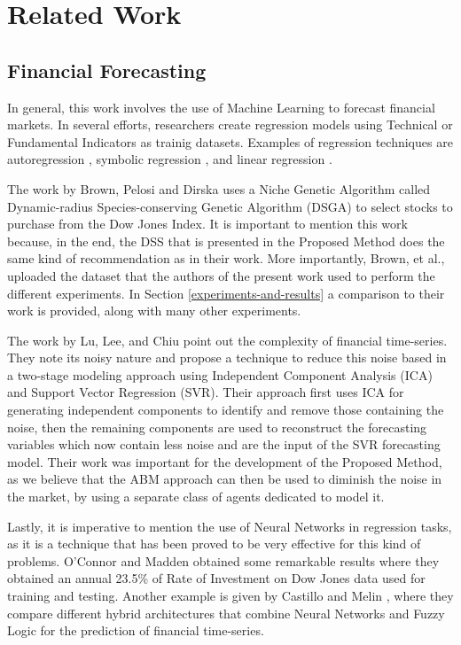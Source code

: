 \documentclass[review]{elsarticle}
\begin{document}
\section{Related Work}
\label{section:related-work}

\subsection{Financial Forecasting}
\label{financial-forecasting}

In general, this work involves the use of Machine Learning to forecast
financial markets. In several efforts, researchers create regression
models using Technical or Fundamental Indicators as trainig
datasets. Examples of regression techniques are autoregression
\cite{burg1968new}, symbolic regression \cite{billard2002symbolic},
and linear regression \cite{kutner2004applied}.

The work by Brown, Pelosi and Dirska \cite{brown2013dynamic} uses a
Niche Genetic Algorithm called Dynamic-radius Species-conserving
Genetic Algorithm (DSGA) to select stocks to purchase from the Dow
Jones Index. It is important to mention this work because, in the end,
the DSS that is presented in the Proposed Method does the same kind of
recommendation as in their work. More importantly, Brown, et al.,
uploaded the dataset that the authors of the present work used to
perform the different experiments. In Section
\ref{experiments-and-results} a comparison to their work is provided,
along with many other experiments.

The work by Lu, Lee, and Chiu \cite{Lu2009} point out the complexity
of financial time-series. They note its noisy nature and propose a
technique to reduce this noise based in a two-stage modeling approach
using Independent Component Analysis (ICA) and Support Vector
Regression (SVR). Their approach first uses ICA for generating
independent components to identify and remove those containing the
noise, then the remaining components are used to reconstruct the
forecasting variables which now contain less noise and are the input
of the SVR forecasting model. Their work was important for the
development of the Proposed Method, as we believe that the ABM
approach can then be used to diminish the noise in the market, by
using a separate class of agents dedicated to model it.

Lastly, it is imperative to mention the use of Neural Networks in
regression tasks, as it is a technique that has been proved to be very
effective for this kind of problems. O'Connor and Madden
\cite{Connor2005} obtained some remarkable results where they obtained
an annual 23.5\% of Rate of Investment on Dow Jones data used for
training and testing. Another example is given by Castillo and Melin
\cite{castillo2001simulation}, where they compare different hybrid
architectures that combine Neural Networks and Fuzzy Logic for the
prediction of financial time-series.
\end{document}
